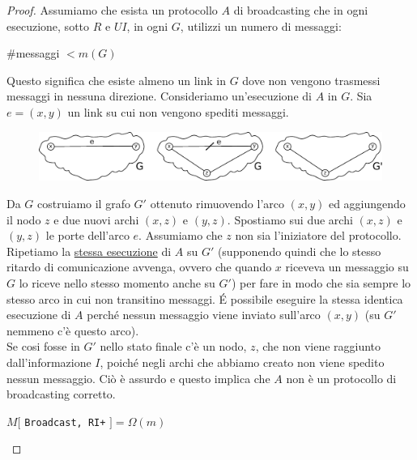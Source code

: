 \begin{proof}
    Assumiamo che esista un protocollo $A$ di broadcasting che in ogni
    esecuzione, sotto $R$ e $UI$, in ogni $G$, utilizzi un numero di messaggi:

    \begin{center}
        \#messaggi $< m(G)$
    \end{center}

    Questo significa che esiste almeno un link in $G$ dove non vengono trasmessi
    messaggi in nessuna direzione. Consideriamo un'esecuzione di $A$ in $G$. Sia
    $e=(x, y)$ un link su cui non vengono spediti messaggi.

    \begin{figure}[H]
        \centering
        \includegraphics[width=13cm, keepaspectratio]{capitoli/broadcast/imgs/n_09}
    \end{figure}

    Da $G$ costruiamo il grafo $G'$ ottenuto rimuovendo l'arco $(x, y)$ ed
    aggiungendo il nodo $z$ e due nuovi archi $(x, z)$ e $(y, z)$. Spostiamo sui
    due archi $(x, z)$ e $(y, z)$ le porte dell'arco $e$. Assumiamo che   $z$
    non sia l'iniziatore del protocollo. Ripetiamo la \underline{stessa
        esecuzione} di $A$ su $G'$ (supponendo quindi che lo stesso ritardo di
    comunicazione avvenga, ovvero che quando $x$ riceveva un messaggio su $G$ lo
    riceve nello stesso momento anche su $G'$) per fare in modo che sia sempre lo
    stesso arco in cui non transitino messaggi. \'E possibile eseguire la stessa
    identica esecuzione di $A$ perché nessun messaggio viene inviato sull'arco
    $(x,y)$ (su $G'$ nemmeno c'è questo arco).\\
    Se cosi fosse in $G'$ nello stato finale c'è un nodo, $z$, che non viene
    raggiunto dall'informazione $I$, poiché negli archi che abbiamo creato non
    viene spedito nessun messaggio. Ciò è assurdo e questo implica che $A$ non è
    un protocollo di broadcasting corretto.

    \begin{center}
        $M[$ \texttt{Broadcast, RI+} $] = \Omega(m)$
    \end{center}

\end{proof}

